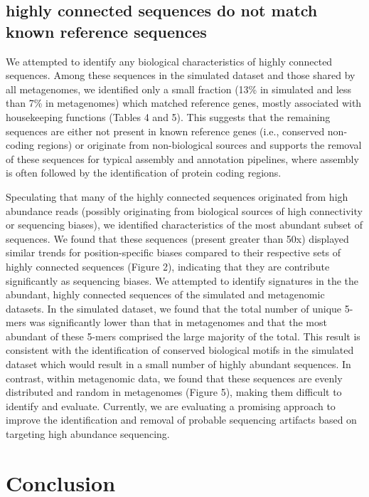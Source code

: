 \documentclass[10pt]{article}
\begin{document}
\subsection*{highly connected sequences do not match known reference sequences}

We attempted to identify any biological characteristics of highly connected sequences.  Among these sequences in the simulated dataset and those shared by all metagenomes, we identified only a small fraction (13\% in simulated and less than 7\% in metagenomes) which matched reference genes, mostly associated with housekeeping functions (Tables 4 and 5).  This suggests that the remaining sequences are either not present in known reference genes (i.e., conserved non-coding regions) or originate from non-biological sources and supports the removal of these sequences for typical assembly and annotation pipelines, where assembly is often followed by the identification of protein coding regions.

Speculating that many of the highly connected sequences originated from high abundance reads (possibly originating from biological sources of high connectivity or sequencing biases), we identified characteristics of the most abundant subset of sequences.  We found that these sequences (present greater than 50x) displayed similar trends for position-specific biases compared to their respective sets of highly connected sequences (Figure 2), indicating that they are contribute significantly as sequencing biases.  We attempted to identify signatures in the the abundant, highly connected sequences of the simulated and metagenomic datasets.  In the simulated dataset, we found that the total number of unique 5-mers was significantly lower than that in metagenomes and that the most abundant of these 5-mers comprised the large majority of the total.  This result is consistent with the identification of conserved biological motifs in the simulated dataset which would result in a small number of highly abundant sequences.  In contrast, within metagenomic data, we found that these sequences are evenly distributed and random in metagenomes (Figure 5), making them difficult to identify and evaluate.  Currently, we are evaluating a promising approach to improve the identification and removal of probable sequencing artifacts based on targeting high abundance sequencing. 

\section*{Conclusion}
\end{document}
